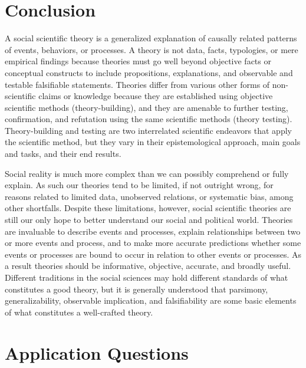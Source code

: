 \documentclass{book}
\begin{document}
\hypertarget{conclusion-1}{%
\section{Conclusion}\label{conclusion-1}}

A social scientific theory is a generalized explanation of causally related
patterns of events, behaviors, or processes. A theory is not data, facts,
typologies, or mere empirical findings because theories must go well beyond
objective facts or conceptual constructs to include propositions,
explanations, and observable and testable falsifiable statements. Theories
differ from various other forms of non-scientific claims or knowledge because
they are established using objective scientific methods (theory-building), and
they are amenable to further testing, confirmation, and refutation using the
same scientific methods (theory testing). Theory-building and testing are two
interrelated scientific endeavors that apply the scientific method, but they
vary in their epistemological approach, main goals and tasks, and their end
results.

Social reality is much more complex than we can possibly comprehend or fully
explain. As such our theories tend to be limited, if not outright wrong, for
reasons related to limited data, unobserved relations, or systematic bias,
among other shortfalls. Despite these limitations, however, social scientific
theories are still our only hope to better understand our social and political
world. Theories are invaluable to describe events and processes, explain
relationships between two or more events and process, and to make more
accurate predictions whether some events or processes are bound to occur in
relation to other events or processes. As a result theories should be
informative, objective, accurate, and broadly useful. Different traditions in
the social sciences may hold different standards of what constitutes a good
theory, but it is generally understood that parsimony, generalizability,
observable implication, and falsifiability are some basic elements of what
constitutes a well-crafted theory.

\hypertarget{application-questions-1}{%
\section{Application Questions}\label{application-questions-1}}
\end{document}
